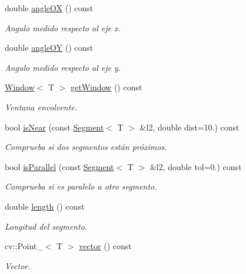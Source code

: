 \begin{DoxyCompactItemize}
double \hyperlink{group___geometric_entities_ga911ebe69ce3cc5e6a486ef573d515866}{angle\+OX} () const 
\begin{DoxyCompactList}\small\item\em Angulo medido respecto al eje x. \end{DoxyCompactList}\item 
double \hyperlink{group___geometric_entities_ga324da1babfedb681fd7068fdc58d763b}{angle\+OY} () const 
\begin{DoxyCompactList}\small\item\em Angulo medido respecto al eje y. \end{DoxyCompactList}\item 
\hyperlink{class_i3_d_1_1_window}{Window}$<$ T $>$ \hyperlink{group___geometric_entities_ga3e11e0ecacba2003a023a21943693263}{get\+Window} () const 
\begin{DoxyCompactList}\small\item\em Ventana envolvente. \end{DoxyCompactList}\item 
bool \hyperlink{group___geometric_entities_ga59115064a0b57956175099eb3ff213ff}{is\+Near} (const \hyperlink{class_i3_d_1_1_segment}{Segment}$<$ T $>$ \&l2, double dist=10.) const 
\begin{DoxyCompactList}\small\item\em Comprueba si dos segmentos están próximos. \end{DoxyCompactList}\item 
bool \hyperlink{group___geometric_entities_ga7a4bcb31c98bdb2e239bdb64073e8874}{is\+Parallel} (const \hyperlink{class_i3_d_1_1_segment}{Segment}$<$ T $>$ \&l2, double tol=0.) const 
\begin{DoxyCompactList}\small\item\em Comprueba si es paralelo a otro segmento. \end{DoxyCompactList}\item 
double \hyperlink{class_i3_d_1_1_segment_a48dc929de83c7e1827e70e8fbf1c25c3}{length} () const 
\begin{DoxyCompactList}\small\item\em Longitud del segmento. \end{DoxyCompactList}\item 
cv\+::\+Point\+\_\+$<$ T $>$ \hyperlink{class_i3_d_1_1_segment_ae3d7380eae0db809d99d4ba81cba14ba}{vector} () const 
\begin{DoxyCompactList}\small\item\em Vector. \end{DoxyCompactList}\end{DoxyCompactItemize}
